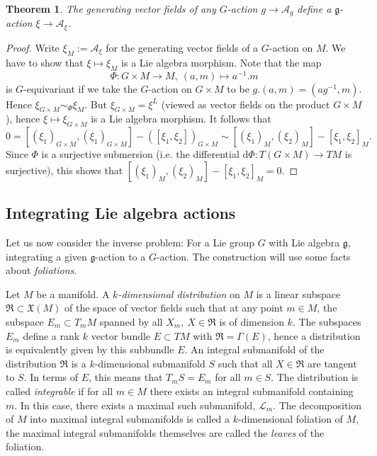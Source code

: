 \documentclass{article}
\newtheorem{theorem}{Theorem}[section]
\theoremstyle{remark}
\newcommand\A{\mathcal{A}}
\newcommand\lie[1]{\mathfrak{#1}}
\newcommand{\g}{\lie{g}}
\renewcommand{\d}{{\mbox{d}}}
\newcommand{\ca}{\mathcal}
\newcommand{\mf}{\mathfrak}
\begin{document}
\begin{theorem}
The generating vector fields of any $G$-action $g\to \A_g$ define a $\g$-action $\xi\to \A_\xi$. 
\end{theorem}
\begin{proof}
Write $\xi_M:=\A_\xi$ for the generating vector fields of a $G$-action on $M$. We have to show 
that $\xi\mapsto \xi_M$ is a Lie algebra morphism. Note that the map
%
\[ \Phi\colon G\times M\to M,\ (a,m)\mapsto a^{-1}.m\]
%
is $G$-equivariant if we take the $G$-action on $G\times M$ to be $g.(a,m)=(ag^{-1},m)$. Hence 
$\xi_{G\times M}\sim_\Phi \xi_M$. But $\xi_{G\times M}=\xi^L$ (viewed as vector fields on 
the product $G\times M$), hence $\xi\mapsto \xi_{G\times M}$ is a Lie algebra morphism. 
It follows that 
\[ 0=[(\xi_1)_{G\times M}, (\xi_1)_{G\times M}]-([\xi_1,\xi_2])_{G\times M}
\sim [(\xi_1)_M,(\xi_2)_M]-[\xi_1,\xi_2]_M.\]
%
Since $\Phi$ is a surjective submersion (i.e. the differential $\d\Phi\colon T(G\times M)\to TM$ is surjective), 
this shows that $[(\xi_1)_M,(\xi_2)_M]-[\xi_1,\xi_2]_M=0$. 
\end{proof}





\subsection{Integrating Lie algebra actions}
%
Let us now consider the inverse problem: For a Lie group $G$ with Lie algebra $\g$, 
integrating a given $\g$-action to a $G$-action. 
The construction will use some facts about \emph{foliations}. 

Let $M$ be a manifold.  A \emph{$k$-dimensional distribution} on $M$ is a linear subspace 
$\mf{R}\subset \mf{X}(M)$ of the space of vector fields such that at any point $m\in M$, the subspace $E_m\subset T_mM$ spanned by all $X_m,\ X\in \mf{R}$ is of dimension $k$. The subspaces $E_m$ define a rank $k$ 
vector bundle  $E\subset TM$ with $\mf{R}=\Gamma(E)$, hence a distribution is equivalently given by this subbundle $E$. 
An integral submanifold of the distribution $\mf{R}$ is a $k$-dimensional submanifold $S$ such that all $X\in\mf{R}$ are 
tangent to $S$. In terms of $E$, this means that $T_mS=E_m$ for all $m\in S$. 
The distribution is called \emph{integrable} if for all $m\in M$ there exists an integral submanifold containing
$m$. In this case, there exists a maximal such submanifold, $\ca{L}_m$. The decomposition of $M$ into maximal integral submanifolds is called a
$k$-dimensional foliation of $M$, the maximal integral submanifolds
themselves are called the \emph{leaves} of the foliation. 
\end{document}
